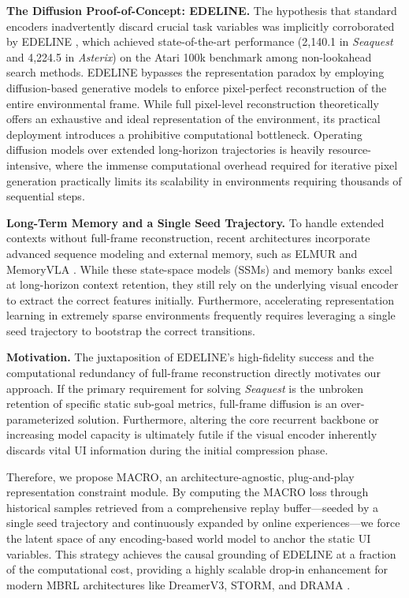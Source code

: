 \documentclass{article} %
\begin{document}
\textbf{The Diffusion Proof-of-Concept: EDELINE.}
The hypothesis that standard encoders inadvertently discard crucial task variables was implicitly corroborated by EDELINE \citep{lee2026edeline}, which achieved state-of-the-art performance (2,140.1 in \textit{Seaquest} and 4,224.5 in \textit{Asterix}) on the Atari 100k benchmark among non-lookahead search methods. EDELINE bypasses the representation paradox by employing diffusion-based generative models to enforce pixel-perfect reconstruction of the entire environmental frame. While full pixel-level reconstruction theoretically offers an exhaustive and ideal representation of the environment, its practical deployment introduces a prohibitive computational bottleneck. Operating diffusion models over extended long-horizon trajectories is heavily resource-intensive, where the immense computational overhead required for iterative pixel generation practically limits its scalability in environments requiring thousands of sequential steps.

\textbf{Long-Term Memory and a Single Seed Trajectory.}
To handle extended contexts without full-frame reconstruction, recent architectures incorporate advanced sequence modeling and external memory, such as ELMUR \citep{cherepanovelmur} and MemoryVLA \citep{shi2025memoryvla}. While these state-space models (SSMs) and memory banks excel at long-horizon context retention, they still rely on the underlying visual encoder to extract the correct features initially. Furthermore, accelerating representation learning in extremely sparse environments frequently requires leveraging a single seed trajectory to bootstrap the correct transitions.

\textbf{Motivation.}
The juxtaposition of EDELINE’s high-fidelity success and the computational redundancy of full-frame reconstruction directly motivates our approach. If the primary requirement for solving \textit{Seaquest} is the unbroken retention of specific static sub-goal metrics, full-frame diffusion is an over-parameterized solution. Furthermore, altering the core recurrent backbone or increasing model capacity is ultimately futile if the visual encoder inherently discards vital UI information during the initial compression phase.

Therefore, we propose MACRO, an architecture-agnostic, plug-and-play representation constraint module. By computing the MACRO loss through historical samples retrieved from a comprehensive replay buffer—seeded by a single seed trajectory and continuously expanded by online experiences—we force the latent space of any encoding-based world model to anchor the static UI variables. This strategy achieves the causal grounding of EDELINE at a fraction of the computational cost, providing a highly scalable drop-in enhancement for modern MBRL architectures like DreamerV3, STORM, and DRAMA \citep{hafner2025mastering, zhang2023storm, wang2025drama}.
\end{document}
